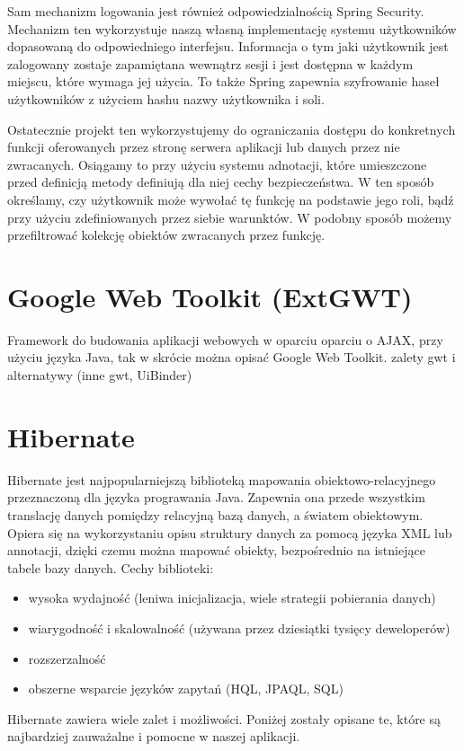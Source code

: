 \documentclass[licencjacka]{pracamgr}
\begin{document}
Sam mechanizm logowania jest również odpowiedzialnością Spring Security. Mechanizm ten wykorzystuje naszą własną implementację systemu użytkowników dopasowaną do odpowiedniego interfejsu. Informacja o tym jaki użytkownik jest zalogowany zostaje zapamiętana wewnątrz sesji i jest dostępna w każdym miejscu, które wymaga jej użycia. To także Spring zapewnia szyfrowanie haseł użytkowników z użyciem hashu nazwy użytkownika i soli.

Ostatecznie projekt ten wykorzystujemy do ograniczania dostępu do konkretnych funkcji oferowanych przez stronę serwera aplikacji lub danych przez nie zwracanych. Osiągamy to przy użyciu systemu adnotacji, które umieszczone przed definicją metody definiują dla niej cechy bezpieczeństwa. W ten sposób określamy, czy użytkownik może wywołać tę funkcję na podstawie jego roli, bądź przy użyciu zdefiniowanych przez siebie warunktów. W podobny sposób możemy przefiltrować kolekcję obiektów zwracanych przez funkcję. 

\section{Google Web Toolkit (ExtGWT)}
Framework do budowania aplikacji webowych w oparciu oparciu o AJAX, przy użyciu języka Java, tak w skrócie można opisać Google Web Toolkit.
zalety gwt i alternatywy (inne gwt, UiBinder)

\section{Hibernate}
Hibernate jest najpopularniejszą biblioteką mapowania obiektowo-relacyjnego przeznaczoną dla języka prograwania Java.
Zapewnia ona przede wszystkim translację danych pomiędzy relacyjną bazą danych, a światem obiektowym. 
Opiera się na wykorzystaniu opisu struktury danych za pomocą języka XML lub annotacji, dzięki czemu można mapować obiekty, 
bezpośrednio na istniejące tabele bazy danych. Cechy biblioteki: 
\begin{itemize}
\item wysoka wydajność (leniwa inicjalizacja, wiele strategii pobierania danych)
\item wiarygodność i skalowalność (używana przez dziesiątki tysięcy deweloperów)
\item rozszerzalność
\item obszerne wsparcie języków zapytań (HQL, JPAQL, SQL) 
\end{itemize}
Hibernate zawiera wiele zalet i możliwości. Poniżej zostały opisane te, które 
są najbardziej zauważalne i pomocne w naszej aplikacji.
\end{document}
